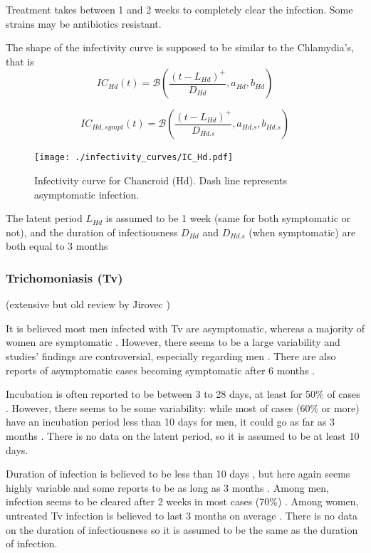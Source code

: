 \documentclass[11pt, onecolumn]{article}
\begin{document}
Treatment takes between 1 and 2 weeks to completely clear the infection. Some strains may be antibiotics resistant.


The shape of the infectivity curve is supposed to be similar to the Chlamydia's, that is
$$IC_{Hd}(t) = \mathcal{B}\left(\frac{(t-L_{Hd})^+}{D_{Hd}},a_{Hd},b_{Hd}\right)$$

$$IC_{Hd,sympt}(t) = \mathcal{B}\left(\frac{(t-L_{Hd})^+}{D_{Hd.s}},a_{Hd.s},b_{Hd.s}\right)$$

\begin{figure}[!ht]
\centering
   \texttt{[image: ./infectivity\_curves/IC\_Hd.pdf]}
\caption{Infectivity curve for Chancroid (Hd). Dash line represents asymptomatic infection.}
\label{fig:ICHd}
\end{figure}


The latent period $L_{Hd}$ is assumed to be 1 week (same for both symptomatic or not), and the duration of infectiousness $D_{Hd}$ and $D_{Hd.s}$ (when symptomatic) are both equal to 3 months


\subsubsection{Trichomoniasis (Tv)}

(extensive but old review by Jirovec \cite{Jirovec:1968vi})

It is believed most men infected with Tv are asymptomatic, whereas a majority of women are symptomatic \cite{Pellicane:2011dk,Schwebke:2004bq}. However, there seems to be a large variability and studies' findings are controversial, especially regarding men \cite{Krieger:1995ur}. There are also reports of asymptomatic cases becoming symptomatic after 6 months \cite{Petrin:1998te}.

Incubation is often reported to be between 3 to 28 days, at least for 50\% of cases \cite{Petrin:1998te}. However, there seems to be some variability: while most of cases (60\% or more) have an incubation period less than 10 days for men, it could go as far as 3 months \cite{Krieger:1995ur}. There is no data on the latent period, so it is assumed to be at least 10 days.

Duration of infection is believed to be less than 10 days \cite{Petrin:1998te}, but here again seems highly variable and some reports to be as long as 3 months \cite{Krieger:1995ur}. Among men, infection seems to be cleared after 2 weeks in most cases (70\%) \cite{Krieger:1995ur}. Among women, untreated Tv infection is believed to last 3 months on average \cite{Pellicane:2011dk}.
There is no data on the duration of infectiousness so it is assumed to be the same as the duration of infection.
\end{document}
